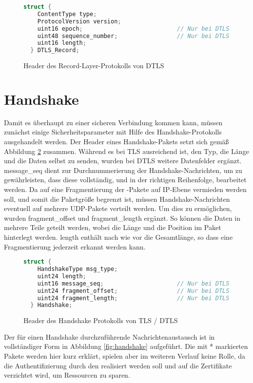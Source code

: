 \begin{figure}[ht]
  \centering
  \begin{lstlisting}[language=c]
  struct {
    ContentType type;
    ProtocolVersion version;
    uint16 epoch;                           // Nur bei DTLS
    uint48 sequence_number;                 // Nur bei DTLS
    uint16 length;
  } DTLS_Record;
  \end{lstlisting}
  \caption{Header des Record-Layer-Protokolls von DTLS}
  \label{fig:recordlayer}
\end{figure}

\section{Handshake}

Damit es überhaupt zu einer sicheren Verbindung kommen kann, müssen zunächst einige Sicherheitsparameter mit Hilfe des Handshake-Protokolls ausgehandelt werden.
Der Header eines Handshake-Pakets setzt sich gemäß Abbildung \ref{fig:handshakelayer} zusammen. Während es bei TLS ausreichend ist, den Typ, die Länge und die Daten selbst
zu senden, wurden bei DTLS weitere Datenfelder ergänzt. message\_seq dient zur Durchnummerierung der Handshake-Nachrichten, um zu gewährleisten, dass diese vollständig,
und in der richtigen Reihenfolge, bearbeitet werden. Da auf eine Fragmentierung der -Pakete auf IP-Ebene vermieden werden soll, und somit die Paketgröße begrenzt ist,
müssen Handshake-Nachrichten eventuell auf mehrere UDP-Pakete verteilt werden. Um dies zu ermöglichen, wurden fragment\_offset und fragment\_length
ergänzt. So können die Daten in mehrere Teile geteilt werden, wobei die Länge und die Position im Paket hinterlegt werden. length enthält nach wie vor die
Gesamtlänge, so dass eine Fragmentierung jederzeit erkannt werden kann.

\begin{figure}[ht]
  \centering
  \begin{lstlisting}[language=c]
  struct {
    HandshakeType msg_type;
    uint24 length;
    uint16 message_seq;                     // Nur bei DTLS
    uint24 fragment_offset;                 // Nur bei DTLS
    uint24 fragment_length;                 // Nur bei DTLS
  } Handshake;
  \end{lstlisting}
  \caption{Header des Handshake Protokolls von TLS / DTLS}
  \label{fig:handshakelayer}
\end{figure}

Der für einen Handshake durchzuführende Nachrichtenaustausch ist in vollständiger Form in Abbildung \ref{fig:handshake} aufgeführt.
Die mit * markierten Pakete werden hier kurz erklärt, spielen aber im weiteren Verlauf keine Rolle, da die Authentifizierung durch
den  realisiert werden soll und auf die Zertifikate verzichtet wird, um Ressourcen zu sparen.

